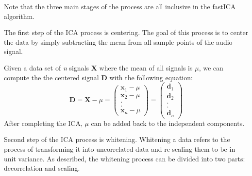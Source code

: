 Note that the three main stages of the process are all inclusive in the fastICA algorithm.

The first step of the ICA process is centering. The goal of this process is to center the data by simply subtracting the mean from all sample points of the audio signal. 

Given a data set of \emph{n} signals \textbf{X} where the mean of all signals is $\mu$, we can compute the the centered signal \textbf{D} with the following equation:
\begin{equation} 
\textbf{D} = \textbf{X} - \mu = \begin{pmatrix}
\textbf{x}_1 - \mu\\
\textbf{x}_2 - \mu\\
.\\
.\\
\textbf{x}_n - \mu
\end{pmatrix} = \begin{pmatrix}
\textbf{d}_1\\
\textbf{d}_2\\
.\\
.\\
\textbf{d}_n
\end{pmatrix}
\end{equation}
After completing the ICA, $\mu$ can be added back to the independent components.

Second step of the ICA process is whitening. Whitening a data refers to the process of transforming it into uncorrelated data and re-scaling them to be in unit variance. As described, the whitening process can be divided into two parts: decorrelation and scaling.

